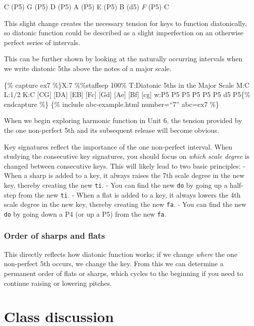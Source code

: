\documentclass{book}
\begin{document}
C (P5) G (P5) D (P5) A (P5) E (P5) B (d5) \emph{F} (P5) C

This slight change creates the necessary tension for keys to function
diatonically, so diatonic function could be described as a slight imperfection
on an otherwise perfect series of intervals.

This can be further shown by looking at the naturally occurring intervals when
we write diatonic 5ths above the notes of a major scale.

\{\% capture ex7 \%\}X:7 \%\%staffsep 100\% T:Diatonic 5ths in the Major Scale
M:C L:1/2 K:C {[}CG{]} {[}DA{]}\textbar{} {[}EB{]} {[}Fc{]}\textbar{} {[}Gd{]}
{[}Ae{]}\textbar{} {[}Bf{]} {[}cg{]}\textbar\textbar{} w:P5 P5 P5 P5 P5 P5 d5
P5\{\% endcapture \%\} \{\% include abc-example.html number=``7'' abc=ex7 \%\}

When we begin exploring harmonic function in Unit 6, the tension provided by
the one non-perfect 5th and its subsequent release will become obvious.

Key signatures reflect the importance of the one non-perfect interval. When
studying the consecutive key signatures, you should focus on \emph{which scale
degree} is changed between consecutive keys. This will likely lead to two
basic principles: - When a sharp is added to a key, it always raises the 7th
scale degree in the new key, thereby creating the new \texttt{ti}. - You can
find the new \texttt{do} by going up a half-step from the new \texttt{ti}. -
When a flat is added to a key, it always lowers the 4th scale degree in the
new key, thereby creating the new \texttt{fa}. - You can find the new
\texttt{do} by going down a P4 (or up a P5) from the new \texttt{fa}.

\hypertarget{order-of-sharps-and-flats-1}{%
\subsection{Order of sharps and flats}\label{order-of-sharps-and-flats-1}}

This directly reflects how diatonic function works; if we change \emph{where}
the one non-perfect 5th occurs, we change the key. From this we can determine
a permanent order of flats or sharps, which cycles to the beginning if you
need to continue raising or lowering pitches.

\hypertarget{class-discussion-61}{%
\chapter{Class discussion}\label{class-discussion-61}}
\end{document}
